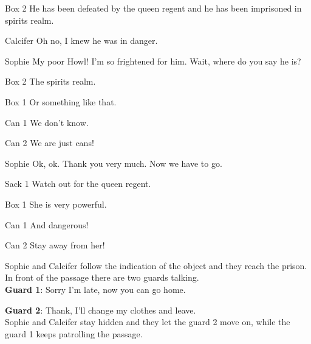 \begin{screenplay}
\begin{dialogue}{Box 2}
He has been defeated by the queen regent and he has been imprisoned in spirits realm.
\end{dialogue}
\begin{dialogue}{Calcifer}
Oh no, I knew he was in danger.
\end{dialogue}
\begin{dialogue}{Sophie}
My poor Howl! I’m so frightened for him. Wait, where do you say he is?
\end{dialogue}
\begin{dialogue}{Box 2}
The spirits realm.
\end{dialogue}
\begin{dialogue}{Box 1}
Or something like that.
\end{dialogue}
\begin{dialogue}{Can 1}
We don’t know.
\end{dialogue}
\begin{dialogue}{Can 2}
We are just cans!
\end{dialogue}
\begin{dialogue}{Sophie}
Ok, ok. Thank you very much. Now we have to go.
\end{dialogue}
\begin{dialogue}{Sack 1}
Watch out for the queen regent.
\end{dialogue}
\begin{dialogue}{Box 1}
She is very powerful.
\end{dialogue}
\begin{dialogue}{Can 1}
And dangerous!
\end{dialogue}
\begin{dialogue}{Can 2}
Stay away from her!
\end{dialogue}
\end{screenplay}

\noindent Sophie and Calcifer follow the indication of the object and they reach the prison. In front of the passage there are two guards talking.\\

\textbf{Guard 1}: Sorry I’m late, now you can go home.

\textbf{Guard 2}: Thank, I’ll change my clothes and leave.\\

\noindent Sophie and Calcifer stay hidden and they let the guard 2 move on, while the guard 1 keeps patrolling the passage.\\

